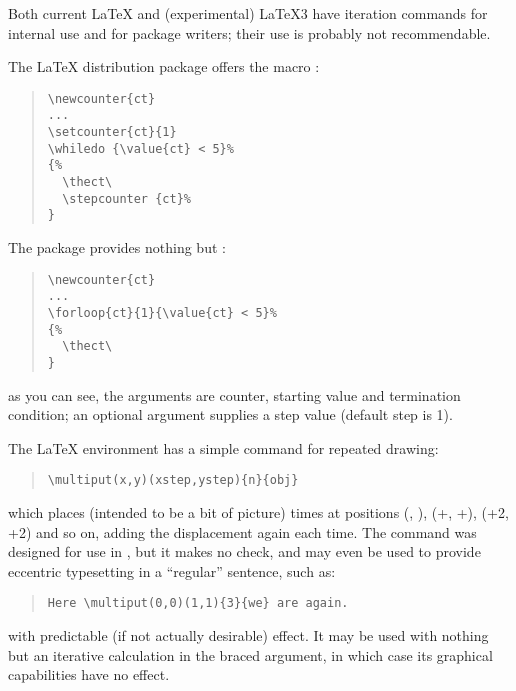 %
Both current \LaTeX{} and (experimental) \LaTeX{}3 have iteration
commands for internal use and for package writers; their use is
probably not recommendable.

The \LaTeX{} distribution package  offers the macro
:
\begin{quote}
\begin{verbatim}
\newcounter{ct}
...
\setcounter{ct}{1}
\whiledo {\value{ct} < 5}%
{%
  \thect\
  \stepcounter {ct}%
}
\end{verbatim}
\end{quote}

The  package provides nothing but :
\begin{quote}
\begin{verbatim}
\newcounter{ct}
...
\forloop{ct}{1}{\value{ct} < 5}%
{%
  \thect\
}
\end{verbatim}
\end{quote}
as you can see, the arguments are counter, starting value and
termination condition; an optional argument supplies a step value
(default step is 1).

The \LaTeX{}  environment has a simple command
for repeated drawing:
\begin{quote}
\begin{verbatim}
\multiput(x,y)(xstep,ystep){n}{obj}
\end{verbatim}
\end{quote}
which places  (intended to be a bit of picture)
\meta{n} times at positions (, ),
(\meta{x}+, \meta{y}+),
(\meta{x}+2\meta{xstep}, \meta{y}+2\meta{ystep}) and so on, adding the
displacement again each time.  The command was designed for use in
\environment{picture}, but it makes no check, and may even be used to
provide eccentric typesetting in a ``regular'' sentence, such as:
\begin{quote}
\begin{verbatim}
Here \multiput(0,0)(1,1){3}{we} are again.
\end{verbatim}
\end{quote}
with predictable (if not actually desirable) effect.  It may be used
with nothing but an iterative calculation in the braced argument, in
which case its graphical capabilities have no effect.

